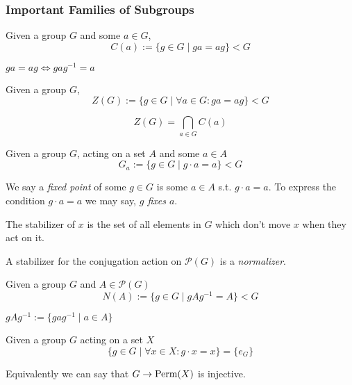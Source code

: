 \subsubsection{Important Families of Subgroups}
\begin{definition}[Centralizer]
   Given a group \(G\) and some \(a \in G\),
   \[C(a) := \{g \in G \mid ga = ag\} < G\]
\end{definition}
\begin{remark}
   \(ga = ag \iff gag^{-1} = a\)
\end{remark}

\begin{definition}[Center]
   Given a group \(G\),
   \[Z(G) := \{g \in G \mid \forall a \in G: ga = ag\} < G\]
\end{definition}
\begin{remark}
   \[Z(G) = \bigcap_{a \in G} C(a)\]
\end{remark}

\begin{definition}[Stabilizer]
   Given a group \(G\), acting on a set \(A\) and some \(a \in A\)
   \[G_a := \{g \in G \mid g \cdot a = a\} < G\]
\end{definition}
\begin{remark}[Terminology]
   We say a \emph{fixed point} of some \(g \in G\) is some \(a \in A\) s.t. \(g \cdot a = a\).
   To express the condition \(g \cdot a = a\) we may say, \emph{\(g\) fixes \(a\)}.
\end{remark}
\begin{remark}[Intuition]
   The stabilizer of \(x\) is the set of all elements in \(G\) which don't move \(x\) when they act on it.
\end{remark}

A stabilizer for the conjugation action on \(\mathcal{P}(G)\) is a \emph{normalizer}.

\begin{definition}[Normalizer]
   Given a group \(G\) and \(A \in \mathcal{P}(G)\)
   \[N(A) := \{g \in G \mid gAg^{-1} = A\} < G\]
\end{definition}
\begin{remark}
   \(gAg^{-1} := \{gag^{-1} \mid a \in A\}\)
\end{remark}

\begin{definition}
   Given a group \(G\) acting on a set \(X\)
   \[\{g \in G \mid \forall x \in X: g \cdot x = x\} = \{e_G\}\]
\end{definition}
\begin{remark}
   Equivalently we can say that \(G \to \operatorname{Perm}(X)\) is injective.
\end{remark}

